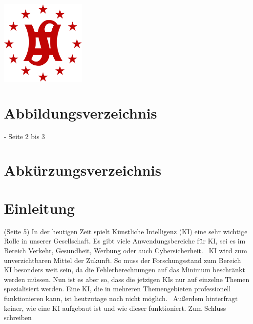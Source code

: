\documentclass[11pt]{article}
\begin{document}
\begin{titlepage}
    
    \includegraphics[width=120pt, keepaspectratio]{images/sghm}\\[2cm]
     
    
    \vfill
    
    \end{titlepage}


\renewcommand{\contentsname}{Inhaltsverzeichnis}
\renewcommand{\figurename}{Abbildung}
\tableofcontents
\newpage
{}


\section*{Abbildungsverzeichnis}
- Seite 2 bis 3

\newpage


\section{Abkürzungsverzeichnis}

\begin{acronym}
\end{acronym}
\newpage

\renewcommand\linenumberfont{\normalfont\small}
\setlength\linenumbersep{1cm}
\linenumbers{}

\section{Einleitung}
(Seite 5)
In der heutigen Zeit spielt Künstliche Intelligenz (KI) eine sehr wichtige Rolle in unserer
Gesellschaft.\label{1} Es gibt viele Anwendungsbereiche für KI, 
sei es im Bereich Verkehr, Gesundheit, Werbung oder auch Cybersicherheit.~\cite{useofki}
KI wird zum unverzichtbaren Mittel der Zukunft. So muss der
Forschungsstand zum Bereich KI besonders weit sein, da die Fehlerberechnungen auf das
Minimum beschränkt werden müssen.\label{2} Nun ist es aber so, dass die jetzigen KIs nur auf einzelne
Themen spezialisiert werden. Eine KI, die in mehreren Themengebieten
professionell funktionieren kann, ist heutzutage noch nicht möglich.~\cite{weakki}
Außerdem hinterfragt keiner, wie eine KI aufgebaut ist und wie dieser funktioniert.
Zum Schluss schreiben
\end{document}
